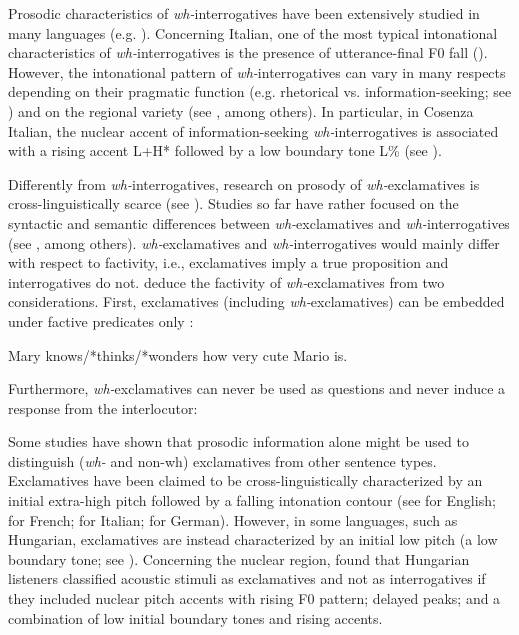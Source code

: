 \documentclass[output=paper]{langsci/langscibook}
\begin{document}
Prosodic characteristics of \textit{wh-}interrogatives have been extensively studied in many languages (e.g. \citealt{Zeng.2004,Hedberg2010,Vanrell2013whquestions}). Concerning Italian, one of the most typical intonational characteristics of \textit{wh-}in\-ter\-ro\-ga\-tives is the presence of utterance-final F0 fall (\citealt{Chapallaz1964,Avesani1995,Sorianello2011exclamative}). However, the intonational pattern of \textit{wh-}interrogatives can vary in many respects depending on their pragmatic function (e.g. rhetorical vs. information-seeking; see \citealt{Hedberg2010}) and on the regional variety (see \citealt{Avesani1995,Sorianello2011exclamative,GiliFivelaETAL2015intonationalvariation}, among others). In particular, in Cosenza Italian, the nuclear accent of information-seeking \textit{wh-}interrogatives is associated with a rising accent L+H* followed by a low boundary tone L\% (see \citealt{Sorianello2011exclamative,Sorianello2011CosenzaPowerPoint}).

Differently from \textit{wh-}interrogatives, research on prosody of \textit{wh-}exclamatives is cross-linguistically scarce (see \citealt{Batliner1988,Sorianello2011exclamative,Gyuris2013}). Studies so far have rather focused on the syntactic and semantic differences between \textit{wh-}exclamatives and \textit{wh-}interrogatives (see \citealt{Portner2003,Castroviejo2006}, among others). \textit{wh-}exclamatives and \textit{wh-}interrogatives would mainly differ with respect to factivity, i.e., exclamatives imply a true proposition and interrogatives do not. \citet{Portner2003} deduce the factivity of \textit{wh-}exclamatives from two considerations. First, exclamatives (including \textit{wh-}exclamatives) can be embedded under factive predicates only \citep[46]{Portner2003}:

\ea\label{ex:kel:3}
 Mary knows/*thinks/*wonders how very cute Mario is.   \\
\z

Furthermore, \textit{wh-}exclamatives can never be used as questions and never induce a response from the interlocutor:


Some studies have shown that prosodic information alone might be used to distinguish (\textit{wh-} and non-wh) exclamatives from other sentence types. Exclamatives have been claimed to be cross-linguistically characterized by an initial extra-high pitch followed by a falling intonation contour (see \citealt{OConnor.1961} for English; \citealt{Delattre1966} for French; \citealt{DEugenio1976} for Italian; \citealt{Batliner1988} for German). However, in some languages, such as Hungarian, exclamatives are instead characterized by an initial low pitch (a low boundary tone; see \citealt{Gyuris2013}). Concerning the nuclear region, \citet{Gyuris2013} found that Hungarian listeners classified acoustic stimuli as exclamatives and not as interrogatives if they included nuclear pitch accents with rising F0 pattern; delayed peaks; and a combination of low initial boundary tones and rising accents.
\end{document}
